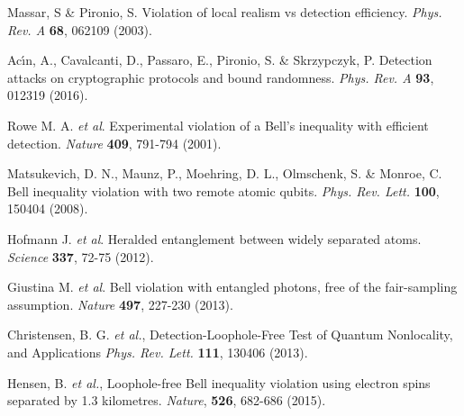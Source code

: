\documentclass[11pt,a4paper]{article}
\begin{document}
{\begin{thebibliography}{99}


Massar, S \& Pironio, S. Violation of local realism vs detection efficiency. \textit{Phys. Rev. A} \textbf{68}, 062109 (2003).

Ac\'\i n, A., Cavalcanti, D., Passaro, E., Pironio, S. \& Skrzypczyk, P. Detection attacks on cryptographic protocols and bound randomness.  \textit{Phys. Rev. A} {\bf 93}, 012319 (2016).


Rowe M. A. {\it et al}. Experimental violation of a Bell's inequality with efficient detection. \textit{Nature} \textbf{409}, 791-794 (2001).

Matsukevich, D. N., Maunz, P., Moehring, D. L., Olmschenk, S. \& Monroe, C. Bell inequality violation with two remote atomic qubits. \textit{Phys. Rev. Lett.} \textbf{100}, 150404 (2008).

Hofmann J. {\em et al}.
Heralded entanglement between widely separated atoms. \textit{Science} \textbf{337}, 72-75 (2012).


Giustina M. {\em et al}.
Bell violation with entangled photons, free of the fair-sampling assumption. \textit{Nature} \textbf{497}, 227-230 (2013).

Christensen, B. G. {\em et al.},
Detection-Loophole-Free Test of Quantum Nonlocality, and Applications \textit{Phys. Rev. Lett.} \textbf{111}, 130406 (2013).

Hensen, B.  {\em et al.},
Loophole-free Bell inequality violation using electron spins separated by 1.3 kilometres.     \textit{Nature}, \textbf{526}, 682-686 (2015).


\end{thebibliography}}
\end{document}

